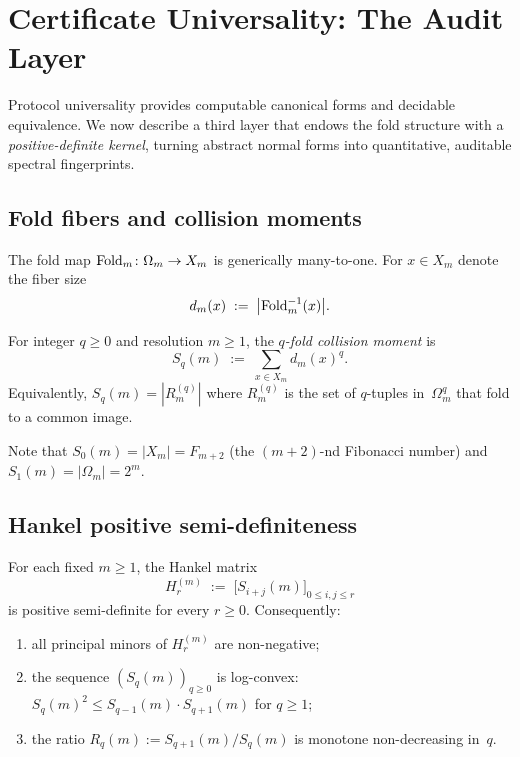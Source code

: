 \section{Certificate Universality: The Audit
  Layer}\label{sec:L2}

Protocol universality provides computable canonical forms and
decidable equivalence.  We now describe a third layer that
endows the fold structure with a \emph{positive-definite kernel},
turning abstract normal forms into quantitative, auditable spectral
fingerprints.

\subsection{Fold fibers and collision moments}\label{ssec:moments}

The fold map $\operatorname{Fold}_{m} \colon \Omega_{m} \to X_{m}$ is
generically many-to-one.  For $x \in X_{m}$ denote the fiber size
\[
  d_{m}(x) \;:=\; \bigl|\operatorname{Fold}_{m}^{-1}(x)\bigr|.
\]

\begin{definition}
\label{def:collision-moment}
For integer $q \ge 0$ and resolution $m \ge 1$, the
\emph{$q$-fold collision moment} is
\begin{equation}\label{eq:Sq}
  S_{q}(m)
    \;:=\; \sum_{x \in X_{m}} d_{m}(x)^{q}.
\end{equation}
Equivalently, $S_{q}(m) = |R_{m}^{(q)}|$ where $R_{m}^{(q)}$
is the set of $q$-tuples in~$\Omega_{m}^{q}$ that fold to a
common image.
\end{definition}

Note that $S_{0}(m) = |X_{m}| = F_{m+2}$
(the $(m{+}2)$-nd Fibonacci number) and
$S_{1}(m) = |\Omega_{m}| = 2^{m}$.

\subsection{Hankel positive semi-definiteness}
\label{ssec:hankel}

\begin{theorem}
\label{thm:hankel-psd}
For each fixed $m \ge 1$, the Hankel matrix
\[
  H_{r}^{(m)}
    \;:=\; \bigl[S_{i+j}(m)\bigr]_{0 \le i,j \le r}
\]
is positive semi-definite for every $r \ge 0$.  Consequently:
\begin{enumerate}[label=(\roman*)]
\item all principal minors of $H_{r}^{(m)}$ are non-negative;
\item the sequence $(S_{q}(m))_{q \ge 0}$ is log-convex:
  $S_{q}(m)^{2} \le S_{q-1}(m) \cdot S_{q+1}(m)$ for $q \ge 1$;
\item the ratio $R_{q}(m) := S_{q+1}(m)/S_{q}(m)$ is monotone
  non-decreasing in~$q$.
\end{enumerate}
\end{theorem}

